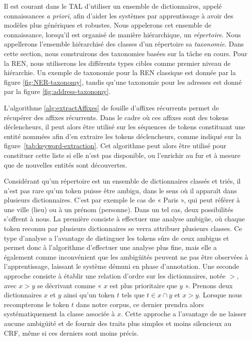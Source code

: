\documentclass[PhD-Yoann-Dupont.tex]{subfiles}
\begin{document}
Il est courant dans le TAL d'utiliser un ensemble de dictionnaires, appelé connaissances \emph{a priori}, afin d'aider les systèmes par apprentissage à avoir des modèles plus génériques et robustes. Nous appelerons cet ensemble de connaissance, lorsqu'il est organisé de manière hiérarchique, un \emph{répertoire}. Nous appellerons l'ensemble hiérarchisé des classes d'un répertoire sa \emph{taxonomie}. Dans cette section, nous construirons des taxonomies basées sur la tâche en cours. Pour la REN, nous utiliserons les différents types cibles comme premier niveau de hiérarchie. Un exemple de taxonomie pour la REN classique est donnée par la figure \ref{fig:NER-taxonomy}, tandis qu'une taxonomie pour les adresses est donné par la figure \ref{fig:address-taxonomy}.

L'algorithme \ref{alg:extractAffixes} de fouille d'affixes récurrents permet de récupérer des affixes récurrents. Dans le cadre où ces affixes sont des tokens déclencheurs, il peut alors être utilisé sur les séquences de tokens constituant une entité nommées afin d'en extraire les tokens déclencheurs, comme indiqué sur la figure\ \ref{tab:keyword-extraction}. Cet algorithme peut alors être utilisé pour constituer cette liste si elle n'est pas disponible, ou l'enrichir au fur et à mesure que de nouvelles entités sont découvertes.

Considérant qu'un répertoire est un ensemble de dictionnaires classés et triés, il n'est pas rare qu'un token puisse être ambigu, dans le sens où il apparaît dans plusieurs dictionnaires. C'est par exemple le cas de « Paris », qui peut référer à une ville (lieu) ou à un prénom (personne). Dans un tel cas, deux possibilités s'offrent à nous. La première consiste à effectuer une analyse ambigüe, où chaque token reconnu par plusieurs dictionnaires se verra attribuer plusieurs classes. Ce type d'analyse a l'avantage de distinguer les tokens sûrs de ceux ambigus et permet donc à l'algorithme d'effectuer une analyse plus fine, mais elle a également comme inconvénient que les ambigüités peuvent ne pas être observées à l'apprentissage, laissant le système démuni en phase d'annotation. Une seconde approche consiste à établir une relation d'ordre sur les dictionnaires, notée $>$, avec $x > y$ se décrivant comme « $x$ est plus prioritaire que $y$ ». Prenons deux dictionnaires $x$ et $y$ ainsi qu'un token $t$ tels que $t \in x \cap y$ et $x > y$. Lorsque nous recompterons le token $t$ dans notre corpus, ce dernier prendra alors systématiquement la classe associée à $x$. Cette approche a l'avantage de ne laisser aucune ambigüité et de fournir des traits plus simples et moins silencieux au CRF, même si ces derniers sont moins précis.
\end{document}

